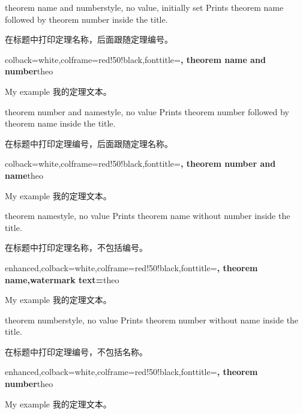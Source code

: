 \begin{docTcbKey}{theorem name and number}{}{style, no value, initially set}
Prints theorem name followed by theorem number inside the title.

在标题中打印定理名称，后面跟随定理编号。
\begin{dispExample}
%
  {colback=white,colframe=red!50!black,fonttitle=\bfseries,
   theorem name and number}{theo}
\begin{sometheorem}{My example}{}
我的定理文本。
\end{sometheorem}
\end{dispExample}
\end{docTcbKey}


\begin{docTcbKey}{theorem number and name}{}{style, no value}
Prints theorem number followed by theorem name inside the title.

在标题中打印定理编号，后面跟随定理名称。
\begin{dispExample}
%
  {colback=white,colframe=red!50!black,fonttitle=\bfseries,
   theorem number and name}{theo}
\begin{sometheorem}{My example}{}
我的定理文本。
\end{sometheorem}
\end{dispExample}
\end{docTcbKey}

\begin{docTcbKey}{theorem name}{}{style, no value}
Prints theorem name without number inside the title.

在标题中打印定理名称，不包括编号。
\begin{dispExample}
%
  {enhanced,colback=white,colframe=red!50!black,fonttitle=\bfseries,
   theorem name,watermark text={\thetcbcounter}}{theo}
\begin{sometheorem}{My example}{}
我的定理文本。
\end{sometheorem}
\end{dispExample}
\end{docTcbKey}


\begin{docTcbKey}[][doc new=2021-12-03]{theorem number}{}{style, no value}
Prints theorem number without name inside the title.

在标题中打印定理编号，不包括名称。
\begin{dispExample}
%
  {enhanced,colback=white,colframe=red!50!black,fonttitle=\bfseries,
   theorem number}{theo}
\begin{sometheorem}{My example}{}
我的定理文本。
\end{sometheorem}
\end{dispExample}
\end{docTcbKey}


